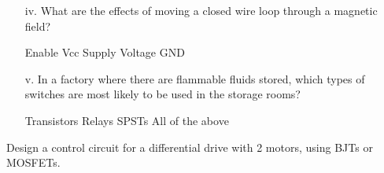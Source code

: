 \documentclass[12pt]{exam}
\begin{document}
\begin{questions}
\begin{enumerate}
\item[iv.]What are the effects of moving a closed wire loop through a magnetic field?
\begin{choices}
\choice Enable
\choice Vcc
\choice Supply Voltage
\choice GND
\end{choices}


\item[v.]In a factory where there are flammable fluids stored, which types of switches are most likely to be used in the storage rooms?
\begin{multicols}{2}
\begin{choices}
\choice Transistors
\choice Relays 
\choice SPSTs 
\choice All of the above
\end{choices}
\end{multicols}
\end{enumerate}

\question[5] Design a control circuit for a differential drive with 2 motors, using BJTs or MOSFETs.
\end{questions}
\newpage
\end{document}
